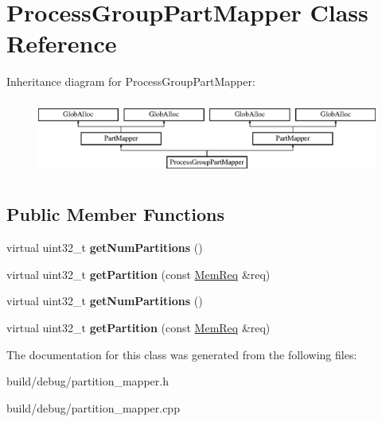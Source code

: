 \hypertarget{classProcessGroupPartMapper}{\section{Process\-Group\-Part\-Mapper Class Reference}
\label{classProcessGroupPartMapper}
}
Inheritance diagram for Process\-Group\-Part\-Mapper\-:\begin{figure}[H]
\begin{center}
\leavevmode
\includegraphics[height=2.500000cm]{classProcessGroupPartMapper}
\end{center}
\end{figure}
\subsection*{Public Member Functions}
\begin{DoxyCompactItemize}
\item 
\hypertarget{classProcessGroupPartMapper_afe8adc1616fa3939456508275362fcb9}{virtual uint32\-\_\-t {\bfseries get\-Num\-Partitions} ()}\label{classProcessGroupPartMapper_afe8adc1616fa3939456508275362fcb9}

\item 
\hypertarget{classProcessGroupPartMapper_ac47505fac59c0e063545d52bf35b1b06}{virtual uint32\-\_\-t {\bfseries get\-Partition} (const \hyperlink{structMemReq}{Mem\-Req} \&req)}\label{classProcessGroupPartMapper_ac47505fac59c0e063545d52bf35b1b06}

\item 
\hypertarget{classProcessGroupPartMapper_abbb98c4695dca021a79e761dd8f115c3}{virtual uint32\-\_\-t {\bfseries get\-Num\-Partitions} ()}\label{classProcessGroupPartMapper_abbb98c4695dca021a79e761dd8f115c3}

\item 
\hypertarget{classProcessGroupPartMapper_a15ab91fb5a62cf4ae48f1163a5fa66c6}{virtual uint32\-\_\-t {\bfseries get\-Partition} (const \hyperlink{structMemReq}{Mem\-Req} \&req)}\label{classProcessGroupPartMapper_a15ab91fb5a62cf4ae48f1163a5fa66c6}

\end{DoxyCompactItemize}


The documentation for this class was generated from the following files\-:\begin{DoxyCompactItemize}
\item 
build/debug/partition\-\_\-mapper.\-h\item 
build/debug/partition\-\_\-mapper.\-cpp\end{DoxyCompactItemize}
